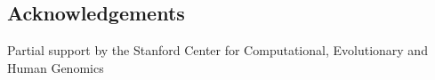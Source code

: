 \documentclass[a0,landscape]{a0poster}
\begin{document}
\begin{multicols}{4}


\nocite{*} %


\section*{Acknowledgements}

Partial support by the Stanford Center for Computational, Evolutionary and Human Genomics


\end{multicols}
\end{document}
